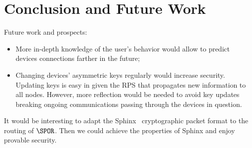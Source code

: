 \section{Conclusion and Future Work}

 Future work and prospects:
\begin{itemize}
	\item More in-depth knowledge of the user's behavior would allow to predict devices connections farther in the future;
	\item Changing devices' asymmetric keys regularly would increase security.
	Updating keys is easy in \name given the RPS that propagates new information to all nodes.
	However, more reflection would be needed to avoid key updates breaking ongoing communications passing through the devices in question.

\end{itemize}

It would be interesting to adapt the Sphinx~\cite{Sphinx} cryptographic packet 
format to the routing of \(\SPOR\).
Then we could achieve the properties of Sphinx and enjoy provable security.
